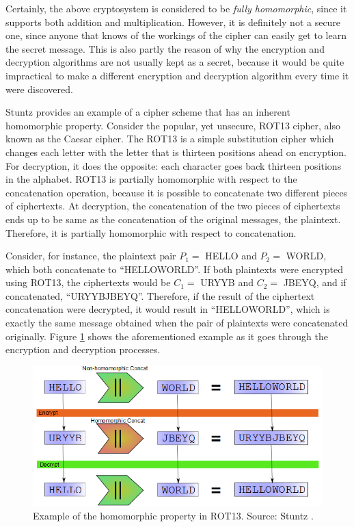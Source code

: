 Certainly, the above cryptosystem is considered to be \emph{fully homomorphic}, since it supports both addition and multiplication. However, it is definitely not a secure one, since anyone that knows of the workings of the cipher can easily get to learn the secret message. This is also partly the reason of why the encryption and decryption algorithms are not usually kept as a secret, because it would be quite impractical to make a different encryption and decryption algorithm every time it were discovered. 

Stuntz \cite{stuntz2010} provides an example of a cipher scheme that has an inherent homomorphic property. Consider the popular, yet unsecure, ROT13 cipher, also known as the Caesar cipher. The ROT13 is a simple substitution cipher which changes each letter with the letter that is thirteen positions ahead on encryption. For decryption, it does the opposite: each character goes back thirteen positions in the alphabet. 
ROT13 is partially homomorphic with respect to the concatenation operation, because it is possible to concatenate two different pieces of ciphertexts. At decryption, the concatenation of the two pieces of ciphertexts ends up to be same as the concatenation of the original messages, the plaintext. Therefore, it is partially homomorphic with respect to concatenation. 

Consider, for instance, the plaintext pair $P_{1}=$ HELLO and $P_{2}=$ WORLD, which both concatenate to ``HELLOWORLD''. If both plaintexts were encrypted using ROT13, the ciphertexts would be $C_{1}=$ URYYB and $C_{2}=$ JBEYQ, and if concatenated, ``URYYBJBEYQ''. Therefore, if the result of the ciphertext concatenation were decrypted, it would result in ``HELLOWORLD'', which is exactly the same message obtained when the pair of plaintexts were concatenated originally. Figure \ref{fig:homosample} shows the aforementioned example as it goes through the encryption and decryption processes. 

\begin{figure}[H]
  \centerline{\includegraphics[scale=0.5]{img/rot13homo}}
  \caption[Example of the homomorphic property in ROT13]{Example of the homomorphic property in ROT13. Source: Stuntz \cite{stuntz2010}.}
  \label{fig:homosample}
\end{figure}


